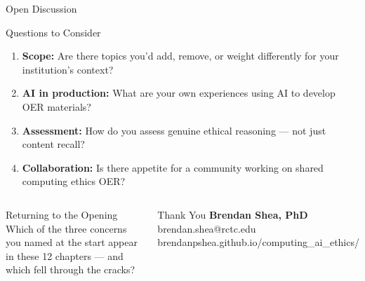 \documentclass[aspectratio=169,10pt]{beamer}
\begin{document}
\begin{frame}{Open Discussion}
\begin{discussionbox}{Questions to Consider}
\begin{enumerate}\small
  \item \textbf{Scope:} Are there topics you'd add, remove, or weight differently for your institution's context?
  \item \textbf{AI in production:} What are your own experiences using AI to develop OER materials?
  \item \textbf{Assessment:} How do you assess genuine ethical reasoning --- not just content recall?
  \item \textbf{Collaboration:} Is there appetite for a community working on shared computing ethics OER?
\end{enumerate}
\end{discussionbox}
\vspace{0.25em}
\begin{columns}[c]
\begin{block}{Returning to the Opening}
\small Which of the three concerns you named at the start appear in these 12 chapters --- and which fell through the cracks?
\end{block}
\begin{block}{Thank You}
\small \textbf{Brendan Shea, PhD}\\
brendan.shea@rctc.edu\\
\footnotesize brendanpshea.github.io/\allowbreak computing\_ai\_ethics/
\end{block}
\end{columns}
\end{frame}
\end{document}
